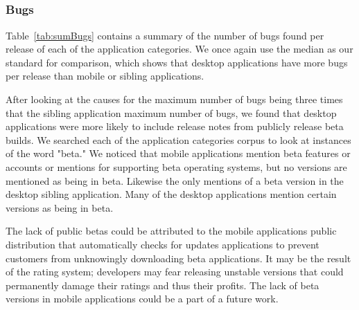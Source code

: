 \documentclass{acm_proc_article-sp}
\begin{document}
\begin{center}


\end{center}

\begin{center}


\end{center}


\subsection{\RQThree }



\subsubsection{Bugs}

\begin{center}


\end{center}

\begin{center}


\end{center}

Table~\ref{tab:sumBugs} contains a summary of the number of bugs found per release of each of the application categories. 
We once again use the median as our standard for comparison, which shows that desktop applications have more bugs per release than mobile or sibling applications. 

After looking at the causes for the maximum number of bugs being three times that the sibling application maximum number of bugs, we found that desktop applications were more likely to include release notes from publicly release beta builds. 
We searched each of the application categories corpus to look at instances of the word "beta."
We noticed that mobile applications mention beta features or accounts or mentions for supporting beta operating systems, but no versions are mentioned as being in beta. 
Likewise the only mentions of a beta version in the desktop sibling application.
Many of the desktop applications mention certain versions as being in beta.

The lack of public betas could be attributed to the mobile applications public distribution that automatically checks for updates applications to prevent customers from unknowingly downloading beta applications. 
It may be the result of the rating system; developers may fear releasing unstable versions that could permanently damage their ratings and thus their profits. 
The lack of beta versions in mobile applications could be a part of a future work.
\end{document}

